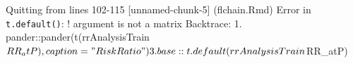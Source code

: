 \documentclass[
]{article}
\newenvironment{Shaded}{\begin{snugshade}}{\end{snugshade}}
\newcommand{\AttributeTok}[1]{\textcolor[rgb]{0.13,0.29,0.53}{#1}}
\newcommand{\FunctionTok}[1]{\textcolor[rgb]{0.13,0.29,0.53}{\textbf{#1}}}
\newcommand{\NormalTok}[1]{#1}
\newcommand{\SpecialCharTok}[1]{\textcolor[rgb]{0.81,0.36,0.00}{\textbf{#1}}}
\newcommand{\StringTok}[1]{\textcolor[rgb]{0.31,0.60,0.02}{#1}}
\begin{document}
\begin{Shaded}
\end{Shaded}

Quitting from lines 102-115 {[}unnamed-chunk-5{]} (flchain.Rmd) Error in
\texttt{t.default()}: ! argument is not a matrix Backtrace: 1.
pander::pander(t(rrAnalysisTrain\(RR_atP), caption = "Risk Ratio")  3. base::t.default(rrAnalysisTrain\)RR\_atP)

\begin{Shaded}
\end{Shaded}
\end{document}
